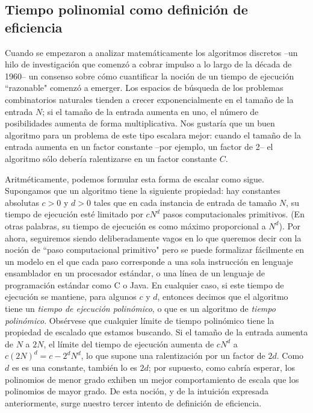 \documentclass[a4paper, 12pt]{book}
\theoremstyle{dotless}
\begin{document}
\subsection*{Tiempo polinomial como definición de eficiencia} 

Cuando se empezaron a analizar matemáticamente los algoritmos discretos --un hilo de investigación que comenzó a cobrar impulso a lo largo de la década de 1960-- un consenso sobre cómo cuantificar la noción de un tiempo de ejecución ``razonable" comenzó a emerger. Los espacios de búsqueda de los problemas combinatorios naturales tienden a crecer exponencialmente en el tamaño de la entrada $N$; si el tamaño de la entrada aumenta en uno, el número de posibilidades aumenta de forma multiplicativa. Nos gustaría que un buen algoritmo para un problema de este tipo escalara mejor: cuando el tamaño de la entrada aumenta en un factor constante --por ejemplo, un factor de 2-- el algoritmo sólo debería ralentizarse en un factor constante $C$.

Aritméticamente, podemos formular esta forma de escalar como sigue. Supongamos que un algoritmo tiene la siguiente propiedad: hay constantes absolutas $c>0$ y $d>0$ tales que en cada instancia de entrada de tamaño $N$, su tiempo de ejecución esté limitado por $cN^d$ pasos computacionales primitivos. (En otras palabras, su tiempo de ejecución es como máximo proporcional a $N^d$). Por ahora, seguiremos siendo deliberadamente vagos en lo que queremos decir con la noción de ``paso computacional primitivo" pero se puede formalizar fácilmente en un modelo en el que cada paso corresponde a una sola instrucción en lenguaje ensamblador en un procesador estándar, o una línea de un lenguaje de programación estándar como C o Java. 
En cualquier caso, si este tiempo de ejecución se mantiene, para algunos $c$ y $d$, entonces decimos que el algoritmo tiene un \textit{tiempo de ejecución polinómico}, o que es un algoritmo de \textit{tiempo polinómico}. Obsérvese que cualquier límite de tiempo polinómico tiene la propiedad de escalado que estamos buscando. Si el tamaño de la entrada aumenta de $N$ a $2N$, el límite del tiempo de ejecución aumenta de $cN^d$ a $c(2N)^d = c-2^dN^d$, lo que supone una ralentización por un factor de $2d$. Como $d$ es es una constante, también lo es $2d$; por supuesto, como cabría esperar, los polinomios de menor grado exhiben un mejor comportamiento de escala que los polinomios de mayor grado.
De esta noción, y de la intuición expresada anteriormente, surge nuestro tercer intento de definición de eficiencia.
\end{document}

